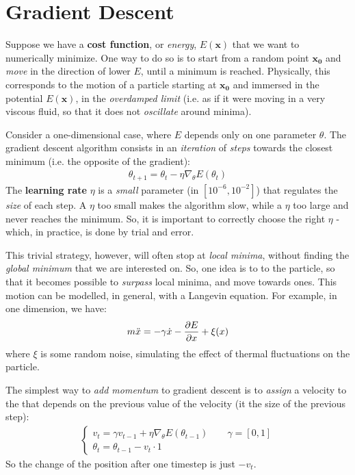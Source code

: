 \documentclass[../template.tex]{subfiles}
\begin{document}
\section{Gradient Descent}
Suppose we have a \textbf{cost function}, or \textit{energy}, $E(\bm{x})$ that we want to numerically minimize. One way to do so is to start from a random point $\bm{x_0}$ and \textit{move} in the direction of lower $E$, until a minimum is reached. Physically, this corresponds to the motion of a particle starting at $\bm{x_0}$ and immersed in the potential $E(\bm{x})$, in the \textit{overdamped limit} (i.e. as if it were moving in a very viscous fluid, so that it does not \textit{oscillate} around minima).  

\medskip

Consider a one-dimensional case, where $E$ depends only on one parameter $\theta$. The gradient descent algorithm consists in an \textit{iteration} of \textit{steps} towards the closest minimum (i.e. the opposite of the gradient):
\begin{align*}
    \theta_{t+1} = \theta_t - \eta \nabla_\theta E(\theta_t)
\end{align*}  
The \textbf{learning rate} $\eta$ is a \textit{small} parameter (in $[10^{-6}, 10^{-2}]$) that regulates the \textit{size} of each step. A $\eta$ too small makes the algorithm slow, while a $\eta$ too large  and never reaches the minimum. So, it is important to correctly choose the right $\eta$ - which, in practice, is done by trial and error.

\medskip

This trivial strategy, however, will often stop at \textit{local minima}, without finding the \textit{global minimum} that we are interested on. So, one idea is to  to the particle, so that it becomes possible to \textit{surpass} local minima, and move towards  ones. This motion can be modelled, in general, with a Langevin equation. For example, in one dimension, we have:
\begin{align*}
    m \ddot{x} = - \gamma \dot{x} - \pdv{E}{x} + \xi(x)
\end{align*} 
where $\xi$ is some random noise, simulating the effect of thermal fluctuations on the particle.

\medskip

The simplest way to \textit{add momentum} to gradient descent is to \textit{assign} a velocity to the  that depends on the previous value of the velocity (it  the size of the previous step):
\begin{align*}
    \begin{cases}
        v_{t} = \gamma v_{t-1} + \eta \nabla_\theta E(\theta_{t-1}) \qquad \gamma = [0,1]\\
        \theta_{t} = \theta_{t-1} - v_{t} \cdot 1
    \end{cases}
\end{align*} 
So the change of the position after one timestep is just $-v_t$.
\end{document}
